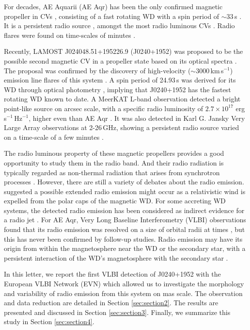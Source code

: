 \documentclass[fleqn,usenatbib]{mnras}
\begin{document}
For decades, AE Aquarii (AE Aqr) has been the only confirmed magnetic propeller in CVs \citep{Eracleous1996,Wynn1997}, consisting of a fast rotating WD with a spin period of $\sim33$\,s \citep{Patterson1979}. It is a persistent radio source \citep{Bookbinder1987}, amongst the most radio luminous CVs \citep{Pretorius2021}. Radio flares were found on time-scales of minutes \citep{Bastian1988}. 

Recently, LAMOST J024048.51+195226.9 (J0240+1952) was proposed to be the possible second magnetic CV in a propeller state based on its optical spectra \citep{Thorstensen2020}. The proposal was confirmed by the discovery of high-velocity ($\sim3000$\,km\,s$^{-1}$) emission line flares of this system \citep{Garnavich2021}. A spin period of 24.93\,s was derived for its WD through optical photometry \citep{Pelisoli2022}, implying that J0240+1952 has the fastest rotating WD known to date. A MeerKAT L-band observation detected a bright point-like source on arcsec scale, with a specific radio luminosity of $2.7\times10^{17}$ erg\,s$^{-1}$\,Hz$^{-1}$, higher even than AE Aqr \citep{Pretorius2021}. It was also detected in Karl G. Jansky Very Large Array observations at 2-26\,GHz, showing a persistent radio source varied on a time-scale of a few minutes \citep{Barrett2022}. 

The radio luminous property of these magnetic propellers provides a good opportunity to study them in the radio band. And their radio radiation is typically regarded as non-thermal radiation that arises from synchrotron processes \citep{Bastian1988,Meintjes2003}. However, there are still a variety of debates about the radio emission. \citet{deJager1994} suggested a possible extended radio emission might occur as a relativistic wind is expelled from the polar caps of the magnetic WD. For some accreting WD systems, the detected radio emission has been considered as indirect evidence for a radio jet \citep{Russell2016}. For AE Aqr, Very Long Baseline Interferometry (VLBI) observations found that its radio emission was resolved on a size of orbital radii at times \citep[][and references therein]{deJager1994}, but this has never been confirmed by follow-up studies. Radio emission may have its origin from within the magnetosphere near the WD or the secondary star, with a persistent interaction of the WD's magnetosphere with the secondary star \citep{Bastian1988,Kuijpers1997,Meintjes2003,Meintjes2023}.   

In this letter, we report the first VLBI detection of J0240+1952 with the European VLBI Network (EVN) which allowed us to investigate the morphology and variability of radio emission from this system on mas scale. The observation and data reduction are detailed in Section \ref{sec:section2}. The results are presented and discussed in Section \ref{sec:section3}. Finally, we summarize this study in Section \ref{sec:section4}.
\end{document}
